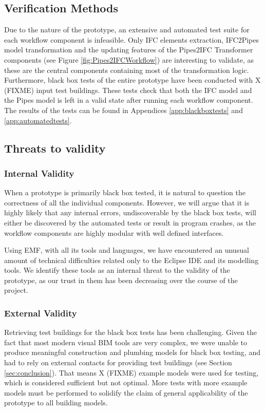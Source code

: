 \subsection{Verification Methods}
\label{subsec:verification_methods}
Due to the nature of the prototype, an extensive and automated test suite for each workflow component is infeasible. Only IFC elements extraction, IFC2Pipes model transformation and the updating features of the Pipes2IFC Transformer components (see Figure \ref{fig:Pipes2IFCWorkflow}) are interesting to validate, as these are the central components containing most of the transformation logic. Furthermore, black box tests of the entire prototype have been conducted with X (FIXME) input test buildings. These tests check that both the IFC model and the Pipes model is left in a valid state after running each workflow component. The results of the tests can be found in Appendices \ref{app:blackboxtests} and \ref{app:automatedtests}.

\subsection{Threats to validity}
\subsubsection{Internal Validity} When a prototype is primarily black box tested, it is natural to question the correctness of all the individual components. However, we will argue that it is highly likely that any internal errors, undiscoverable by the black box tests, will either be discovered by the automated tests or result in program crashes, as the workflow components are highly modular with well defined interfaces.

Using EMF, with all its tools and languages, we have encountered an unusual amount of technical difficulties related only to the Eclipse IDE and its modelling tools. We identify these tools as an internal threat to the validity of the prototype, as our trust in them has been decreasing over the course of the project.

\subsubsection{External Validity} Retrieving test buildings for the black box tests has been challenging. Given the fact that most modern visual BIM tools are very complex, we were unable to produce meaningful construction and plumbing models for black box testing, and had to rely on external contacts for providing test buildings (see Section \ref{sec:conclusion}). That means X (FIXME) example models were used for testing, which is considered sufficient but not optimal. More tests with more example models must be performed to solidify the claim of general applicability of the prototype to all building models.

